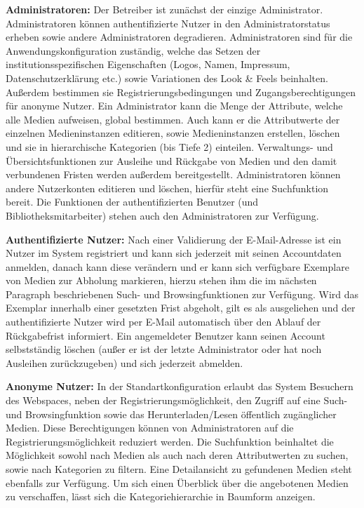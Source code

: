 \documentclass{article}
\begin{document}
\begin{flushleft}
\textbf{Administratoren:} Der Betreiber ist zunächst der einzige Administrator. Administratoren können authentifizierte Nutzer in den Administratorstatus erheben sowie andere Administratoren degradieren. Administratoren sind für die Anwendungskonfiguration zuständig, welche das Setzen der institutionsspezifischen Eigenschaften (Logos, Namen, Impressum, Datenschutzerklärung etc.) sowie Variationen des Look \& Feels beinhalten. Außerdem bestimmen sie Registrierungsbedingungen und Zugangsberechtigungen für anonyme Nutzer. Ein Administrator kann die Menge der Attribute, welche alle Medien aufweisen, global bestimmen. Auch kann er die Attributwerte der einzelnen Medieninstanzen editieren, sowie Medieninstanzen erstellen, löschen und sie in hierarchische Kategorien (bis Tiefe 2) einteilen. Verwaltungs- und Übersichtsfunktionen zur Ausleihe und Rückgabe von Medien und den damit verbundenen Fristen werden außerdem bereitgestellt. Administratoren können andere Nutzerkonten editieren und löschen, hierfür steht eine Suchfunktion bereit. Die Funktionen der authentifizierten Benutzer (und Bibliotheksmitarbeiter) stehen auch den Administratoren zur Verfügung.
\end{flushleft}

\begin{flushleft}
\textbf{Authentifizierte Nutzer:} Nach einer Validierung der E-Mail-Adresse ist ein Nutzer im System registriert und kann sich jederzeit mit seinen Accountdaten anmelden, danach kann diese verändern und er kann sich verfügbare Exemplare von Medien zur Abholung markieren, hierzu stehen ihm die im nächsten Paragraph beschriebenen Such- und Browsingfunktionen zur Verfügung. Wird das Exemplar innerhalb einer gesetzten Frist abgeholt, gilt es als ausgeliehen und der authentifizierte Nutzer wird per E-Mail automatisch über den Ablauf der Rückgabefrist informiert. Ein angemeldeter Benutzer kann seinen Account selbstständig löschen (außer er ist der letzte Administrator oder hat noch Ausleihen zurückzugeben) und sich jederzeit abmelden.
\end{flushleft}

\begin{flushleft}
\textbf{Anonyme Nutzer:} In der Standartkonfiguration erlaubt das System Besuchern des Webspaces, neben der Registrierungsmöglichkeit, den Zugriff auf eine Such- und Browsingfunktion sowie das Herunterladen/Lesen öffentlich zugänglicher Medien. Diese Berechtigungen können von Administratoren auf die Registrierungsmöglichkeit reduziert werden. Die Suchfunktion beinhaltet die Möglichkeit sowohl nach Medien als auch nach deren Attributwerten zu suchen, sowie nach Kategorien zu filtern. Eine Detailansicht zu gefundenen Medien steht ebenfalls zur Verfügung. Um sich einen Überblick über die angebotenen Medien zu verschaffen, lässt sich die Kategoriehierarchie in Baumform anzeigen.
\end{flushleft}
\end{document}
